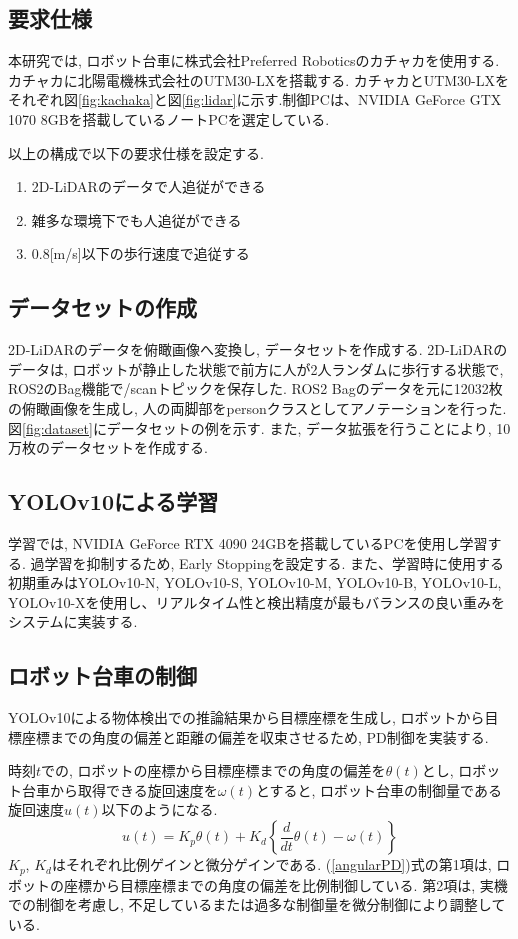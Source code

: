 \documentclass[twocolumn]{jarticle} %
\begin{document}
\subsection{要求仕様}
本研究では, ロボット台車に株式会社Preferred Roboticsのカチャカを使用する. カチャカに北陽電機株式会社のUTM30-LXを搭載する. カチャカとUTM30-LXをそれぞれ図\ref{fig:kachaka}と図\ref{fig:lidar}に示す.制御PCは、NVIDIA GeForce GTX 1070 8GBを搭載しているノートPCを選定している.

以上の構成で以下の要求仕様を設定する.
\begin{enumerate}
    \item 2D-LiDARのデータで人追従ができる
    \item 雑多な環境下でも人追従ができる
    \item 0.8[m/s]以下の歩行速度で追従する
\end{enumerate}
\subsection{データセットの作成}
2D-LiDARのデータを俯瞰画像へ変換し, データセットを作成する. 2D-LiDARのデータは, ロボットが静止した状態で前方に人が2人ランダムに歩行する状態で, ROS2のBag機能で/scanトピックを保存した. ROS2 Bagのデータを元に12032枚の俯瞰画像を生成し, 人の両脚部をpersonクラスとしてアノテーションを行った. 図\ref{fig:dataset}にデータセットの例を示す. また, データ拡張を行うことにより, 10万枚のデータセットを作成する.
\subsection{YOLOv10による学習}
学習では, NVIDIA GeForce RTX 4090 24GBを搭載しているPCを使用し学習する. 過学習を抑制するため, Early Stoppingを設定する. また、学習時に使用する初期重みはYOLOv10-N, YOLOv10-S, YOLOv10-M, YOLOv10-B, YOLOv10-L, YOLOv10-Xを使用し、リアルタイム性と検出精度が最もバランスの良い重みをシステムに実装する.
\subsection{ロボット台車の制御}
YOLOv10による物体検出での推論結果から目標座標を生成し, ロボットから目標座標までの角度の偏差と距離の偏差を収束させるため, PD制御を実装する.

時刻$t$での, ロボットの座標から目標座標までの角度の偏差を$\theta(t)$とし, ロボット台車から取得できる旋回速度を$\omega(t)$とすると, ロボット台車の制御量である旋回速度$u(t)$以下のようになる.
\begin{equation}
\label{angularPD}
u(t) = K_p \theta(t) + K_d \left\{\frac{d}{dt} \theta(t) - \omega(t) \right\}
\end{equation}
$K_p$, $K_d$はそれぞれ比例ゲインと微分ゲインである. (\ref{angularPD})式の第1項は, ロボットの座標から目標座標までの角度の偏差を比例制御している. 第2項は, 実機での制御を考慮し, 不足しているまたは過多な制御量を微分制御により調整している.
\end{document}
